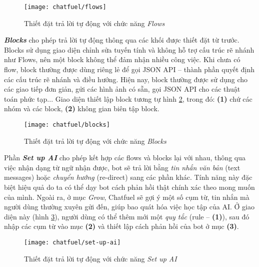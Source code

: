 \begin{figure}[htb!]\centering
	\texttt{[image: chatfuel/flows]}
	\caption{Thiết đặt trả lời tự động với chức năng \textit{Flows}}
	\label{fig:fig-c3-flows}
\end{figure}\par

\textbf{\textit{Blocks}} cho phép trả lời tự động thông qua các khối được thiết đặt từ trước. Blocks sử dụng giao diện chỉnh sửa tuyến tính và không hỗ trợ cấu trúc rẽ nhánh như Flows, nên một block không thể đảm nhận nhiều công việc. Khi chưa có flow, block thường được dùng riêng lẻ để gọi JSON API – thành phần quyết định các cấu trúc rẽ nhánh và điều hướng. Hiện nay, block thường được sử dụng cho các giao tiếp đơn giản, gửi các hình ảnh có sẵn, gọi JSON API cho các thuật toán phức tạp... Giao diện thiết lập block tương tự hình \ref{fig:fig-c3-blocks}, trong đó: \textbf{(1)} chứ các nhóm và các block, \textbf{(2)} không gian biên tập block.\par
\begin{figure}[htb!]\centering
	\texttt{[image: chatfuel/blocks]}
	\caption{Thiết đặt trả lời tự động với chức năng \textit{Blocks}}
	\label{fig:fig-c3-blocks}
\end{figure}\par

Phần \textbf{\textit{Set up AI}} cho phép kết hợp các flows và blocks lại với nhau, thông qua việc nhận dạng từ ngữ nhận được, bot sẽ trả lời bằng \textit{tin nhắn văn bản} (text messages) hoặc \textit{chuyển hướng} (re-direct) sang các phần khác. Tính năng này đặc biệt hiệu quả do ta có thể dạy bot cách phản hồi thật chính xác theo mong muốn của mình. Ngoài ra, ở mục \textit{Grow}, Chatfuel sẽ gợi ý một số cụm từ, tin nhắn mà người dùng thường xuyên gửi đến, giúp bao quát hóa việc học tập của AI. Ở giao diện này (hình \ref{fig:fig-c3-set-up-ai}), người dùng có thể thêm mới một \textit{quy tắc} (rule – \textbf{(1)}), sau đó nhập các cụm từ vào mục \textbf{(2)} và thiết lập cách phản hồi của bot ở mục \textbf{(3)}.\par
\begin{figure}[htb!]\centering
	\texttt{[image: chatfuel/set-up-ai]}
	\caption{Thiết đặt trả lời tự động với chức năng \textit{Set up AI}}
	\label{fig:fig-c3-set-up-ai}
\end{figure}\par

